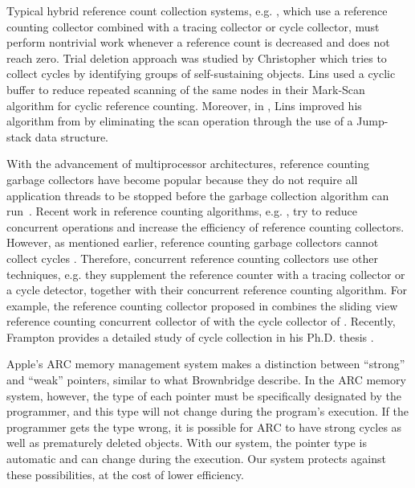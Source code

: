 Typical hybrid reference count collection systems, e.g. \cite{Bacon2001,Levanoni2006,Bacon:2001:JWC,Barabash2005,Lins2008}, which use a reference counting collector combined with a tracing collector or cycle collector,
must perform nontrivial work whenever a reference count is decreased and does
not reach zero. Trial deletion approach was studied by Christopher \cite{Christopher1984} which tries to collect cycles by identifying groups of self-sustaining objects. 
Lins \cite{Lins:1992:CRC} used a cyclic buffer to reduce repeated scanning of the same nodes in their Mark-Scan algorithm for cyclic reference counting. Moreover, in \cite{Lins:2002:EAC}, Lins improved his algorithm  from \cite{Lins:1992:CRC} by eliminating the scan operation through the use of a Jump-stack data structure.

With the advancement of multiprocessor architectures,
reference counting garbage collectors have become popular because
they do not require all application threads to be stopped before the garbage collection algorithm can run~\cite{Levanoni2006}.
Recent work in reference counting algorithms, e.g. \cite{Barabash2005,Levanoni2006,Bacon2001,Bacon:2001:JWC}, try to
reduce concurrent operations and increase the efficiency of reference counting collectors.
However, as mentioned earlier, reference counting garbage collectors cannot collect cycles \cite{McBeth1963}. Therefore, concurrent reference counting collectors \cite{Barabash2005,Levanoni2006,Bacon2001,Bacon:2001:JWC,Paz2007,Lins2008} use other techniques, e.g. they supplement the reference counter with a tracing collector or a cycle detector, together with their concurrent reference counting algorithm. For example, the reference counting collector proposed in \cite{Paz2007} combines the sliding view reference counting concurrent collector of \cite{Levanoni2006} with the cycle collector of \cite{Bacon2001}. Recently, Frampton provides a detailed study of cycle collection in his Ph.D. thesis \cite{Frampton2010}.


Apple's ARC memory management system makes a distinction between ``strong'' and ``weak'' pointers, similar to what Brownbridge describe. In the ARC memory system, however, the type of each pointer must be specifically designated by the programmer, and this type will not change during the program's execution. If the programmer gets the type wrong, it is possible for ARC to have strong cycles as well as prematurely deleted objects. With our system, the pointer type is automatic and can change during the execution. Our system protects against these possibilities, at the cost of lower efficiency.

